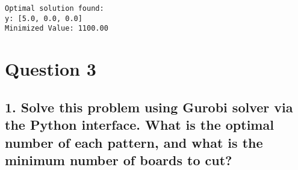 \documentclass[11pt]{article}
\begin{document}
    \begin{Verbatim}[commandchars=\\\{\}]
Optimal solution found:
y: [5.0, 0.0, 0.0]
Minimized Value: 1100.00
    \end{Verbatim}

    \hypertarget{question-3}{%
\section{Question 3}\label{question-3}}

    \hypertarget{solve-this-problem-using-gurobi-solver-via-the-python-interface.-what-is-the-optimal-number-of-each-pattern-and-what-is-the-minimum-number-of-boards-to-cut}{%
\subsection{1. Solve this problem using Gurobi solver via the Python
interface. What is the optimal number of each pattern, and what is the
minimum number of boards to
cut?}\label{solve-this-problem-using-gurobi-solver-via-the-python-interface.-what-is-the-optimal-number-of-each-pattern-and-what-is-the-minimum-number-of-boards-to-cut}}
\end{document}
